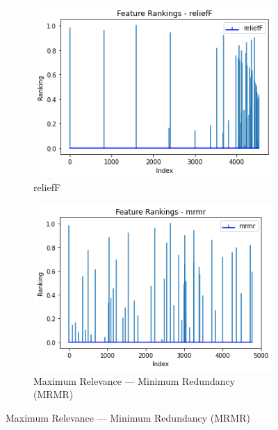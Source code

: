 \documentclass[runningheads]{llncs}
\begin{document}
\begin{figure}[htb]
  \centering
  \begin{subfigure}[b]{\linewidth}
    \includegraphics[width=1\linewidth]{fish_rankings_k-50_reliefF.png}
    \caption{reliefF}
    \label{fig:fish-rankings-reliefF}
  \end{subfigure}

  \begin{subfigure}[b]{\linewidth}
    \includegraphics[width=1\linewidth]{fish_rankings_k-50_mrmr.png}
    \caption{Maximum Relevance — Minimum Redundancy (MRMR)}
    \label{fig:fish-rankings-mrmr}
  \end{subfigure}


\end{figure}
\end{document}
